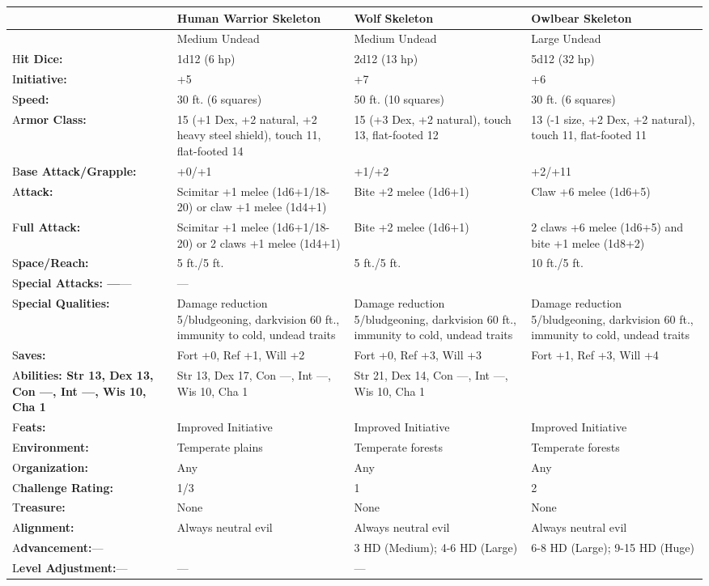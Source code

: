 \documentclass{article}
\begin{document}
\vspace{12pt}
\begin{tabular}{|>{\raggedright}p{69pt}|>{\raggedright}p{77pt}|>{\raggedright}p{77pt}|>{\raggedright}p{77pt}|}
\hline
  & H\textbf{uman Warrior Skeleton } & W\textbf{olf Skeleton } & O\textbf{wlbear 
Skeleton}\tabularnewline
\hline
  & Medium Undead  & Medium Undead  & Large Undead\tabularnewline
\hline
H\textbf{it Dice: } & 1d12 (6 hp)  & 2d12 (13 hp)  & 5d12 (32 hp)\tabularnewline
\hline
I\textbf{nitiative: } & +5  & +7  & +6\tabularnewline
\hline
S\textbf{peed: } & 30 ft. (6 squares)  & 50 ft. (10 squares)  & 30 ft. (6 squares)\tabularnewline
\hline
A\textbf{rmor Class: } & 15 (+1 Dex, +2 natural, +2 heavy steel shield), touch 
11, flat-footed 14 & 15 (+3 Dex, +2 natural), touch 13, flat-footed 12 & 13 (-1 
size, +2 Dex, +2 natural), touch 11, flat-footed 11\tabularnewline
\hline
B\textbf{ase Attack/Grapple:} & +0/+1 & +1/+2 & +2/+11\tabularnewline
\hline
A\textbf{ttack:} & Scimitar +1 melee (1d6+1/18-20) or claw +1 melee (1d4+1) & Bite 
+2 melee (1d6+1) & Claw +6 melee (1d6+5)\tabularnewline
\hline
F\textbf{ull Attack:} & Scimitar +1 melee (1d6+1/18-20) or 2 claws +1 melee (1d4+1) & Bite 
+2 melee (1d6+1) & 2 claws +6 melee (1d6+5) and bite +1 melee (1d8+2)\tabularnewline
\hline
S\textbf{pace/Reach:} & 5 ft./5 ft. & 5 ft./5 ft. & 10 ft./5 ft.\tabularnewline
\hline
S\textbf{pecial Attacks: ---}--- & --- &  & \tabularnewline
\hline
S\textbf{pecial Qualities:} & Damage reduction 5/bludgeoning, darkvision 60 ft., 
immunity to cold, undead traits & Damage reduction 5/bludgeoning, darkvision 60 
ft., immunity to cold, undead traits & Damage reduction 5/bludgeoning, darkvision 
60 ft., immunity to cold, undead traits\tabularnewline
\hline
S\textbf{aves:} & Fort +0, Ref +1, Will +2 & Fort +0, Ref +3, Will +3 & Fort +1, 
Ref +3, Will +4\tabularnewline
\hline
A\textbf{bilities: Str 13, Dex 13, Con ---, Int ---, Wis 10, Cha 1} & Str 13, Dex 
17, Con ---, Int ---, Wis 10, Cha 1 & Str 21, Dex 14, Con ---, Int ---, Wis 10, 
Cha 1 & \tabularnewline
\hline
F\textbf{eats:} & Improved Initiative & Improved Initiative & Improved Initiative\tabularnewline
\hline
E\textbf{nvironment:} & Temperate plains & Temperate forests & Temperate forests\tabularnewline
\hline
O\textbf{rganization:} & Any & Any & Any\tabularnewline
\hline
C\textbf{hallenge Rating:} & 1/3 & 1 & 2\tabularnewline
\hline
T\textbf{reasure:} & None & None & None\tabularnewline
\hline
A\textbf{lignment:} & Always neutral evil & Always neutral evil & Always neutral 
evil\tabularnewline
\hline
A\textbf{dvancement:}--- &  & 3 HD (Medium); 4-6 HD (Large) & 6-8 HD (Large); 9-15 
HD (Huge)\tabularnewline
\hline
L\textbf{evel Adjustment:}--- & --- & --- & \tabularnewline
\hline
\end{tabular}
\end{document}
